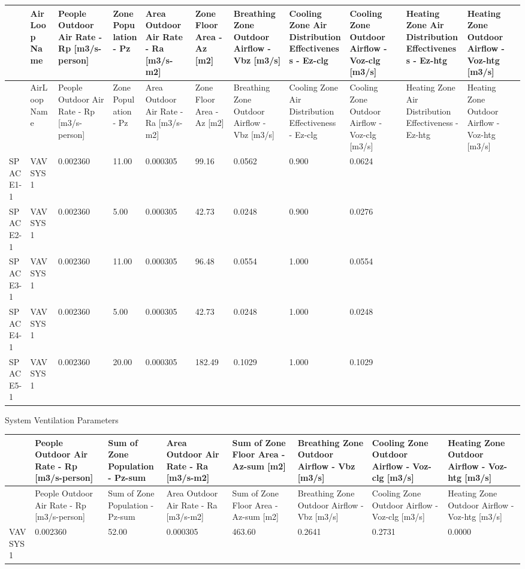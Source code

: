 {\scriptsize
\begin{longtable}[c]{>{\raggedright}p{0.54in}>{\raggedright}p{0.54in}>{\raggedright}p{0.54in}>{\raggedright}p{0.54in}>{\raggedright}p{0.54in}>{\raggedright}p{0.54in}>{\raggedright}p{0.54in}>{\raggedright}p{0.54in}>{\raggedright}p{0.54in}>{\raggedright}p{0.54in}>{\raggedright}p{0.54in}}
\toprule
 & AirLoop Name & People Outdoor Air Rate - Rp [m3/s-person] & Zone Population - Pz & Area Outdoor Air Rate - Ra [m3/s-m2] & Zone Floor Area - Az [m2] & Breathing Zone Outdoor Airflow - Vbz [m3/s] & Cooling Zone Air Distribution Effectiveness - Ez-clg & Cooling Zone Outdoor Airflow - Voz-clg [m3/s] & Heating Zone Air Distribution Effectiveness - Ez-htg & Heating Zone Outdoor Airflow - Voz-htg [m3/s] \tabularnewline
\midrule
\endfirsthead

\toprule
 & AirLoop Name & People Outdoor Air Rate - Rp [m3/s-person] & Zone Population - Pz & Area Outdoor Air Rate - Ra [m3/s-m2] & Zone Floor Area - Az [m2] & Breathing Zone Outdoor Airflow - Vbz [m3/s] & Cooling Zone Air Distribution Effectiveness - Ez-clg & Cooling Zone Outdoor Airflow - Voz-clg [m3/s] & Heating Zone Air Distribution Effectiveness - Ez-htg & Heating Zone Outdoor Airflow - Voz-htg [m3/s] \tabularnewline
\midrule
\endhead

SPACE1-1 & VAV SYS 1 & 0.002360 & 11.00 & 0.000305 & 99.16 & 0.0562 & 0.900 & 0.0624 & ~ & ~ \tabularnewline
SPACE2-1 & VAV SYS 1 & 0.002360 & 5.00 & 0.000305 & 42.73 & 0.0248 & 0.900 & 0.0276 & ~ & ~ \tabularnewline
SPACE3-1 & VAV SYS 1 & 0.002360 & 11.00 & 0.000305 & 96.48 & 0.0554 & 1.000 & 0.0554 & ~ & ~ \tabularnewline
SPACE4-1 & VAV SYS 1 & 0.002360 & 5.00 & 0.000305 & 42.73 & 0.0248 & 1.000 & 0.0248 & ~ & ~ \tabularnewline
SPACE5-1 & VAV SYS 1 & 0.002360 & 20.00 & 0.000305 & 182.49 & 0.1029 & 1.000 & 0.1029 & ~ & ~ \tabularnewline
\bottomrule
\end{longtable}}

System Ventilation Parameters

{\scriptsize
\begin{longtable}[c]{>{\raggedright}p{0.75in}>{\raggedright}p{0.75in}>{\raggedright}p{0.75in}>{\raggedright}p{0.75in}>{\raggedright}p{0.75in}>{\raggedright}p{0.75in}>{\raggedright}p{0.75in}>{\raggedright}p{0.75in}}
\toprule
 & People Outdoor Air Rate - Rp [m3/s-person] & Sum of Zone Population - Pz-sum & Area Outdoor Air Rate - Ra [m3/s-m2] & Sum of Zone Floor Area - Az-sum [m2] & Breathing Zone Outdoor Airflow - Vbz [m3/s] & Cooling Zone Outdoor Airflow - Voz-clg [m3/s] & Heating Zone Outdoor Airflow - Voz-htg [m3/s] \tabularnewline
\midrule
\endfirsthead

\toprule
 & People Outdoor Air Rate - Rp [m3/s-person] & Sum of Zone Population - Pz-sum & Area Outdoor Air Rate - Ra [m3/s-m2] & Sum of Zone Floor Area - Az-sum [m2] & Breathing Zone Outdoor Airflow - Vbz [m3/s] & Cooling Zone Outdoor Airflow - Voz-clg [m3/s] & Heating Zone Outdoor Airflow - Voz-htg [m3/s] \tabularnewline
\midrule
\endhead

VAV SYS 1 & 0.002360 & 52.00 & 0.000305 & 463.60 & 0.2641 & 0.2731 & 0.0000 \tabularnewline
\bottomrule
\end{longtable}}

